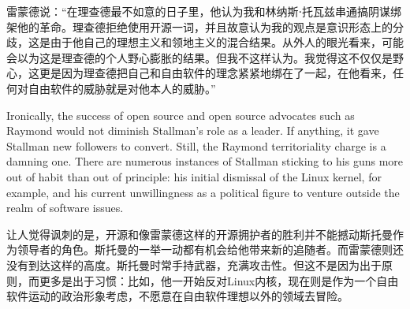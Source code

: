 \ifdefined\chs
雷蒙德说：``在理查德最不如意的日子里，他认为我和林纳斯⋅托瓦兹串通搞阴谋绑架他的革命。理查德拒绝使用开源一词，并且故意认为我的观点是意识形态上的分歧，这是由于他自己的理想主义和领地主义的混合结果。从外人的眼光看来，可能会以为这是理查德的个人野心膨胀的结果。但我不这样认为。我觉得这不仅仅是野心，这更是因为理查德把自己和自由软件的理念紧紧地绑在了一起，在他看来，任何对自由软件的威胁就是对他本人的威胁。''
\fi



\ifdefined\eng
Ironically, the success of open source and open source advocates such as Raymond would not diminish Stallman's role as a leader. If anything, it gave Stallman new followers to convert. Still, the Raymond territoriality charge is a damning one. There are numerous instances of Stallman sticking to his guns more out of habit than out of principle: his initial dismissal of the Linux kernel, for example, and his current unwillingness as a political figure to venture outside the realm of software issues.
\fi

\ifdefined\chs
让人觉得讽刺的是，开源和像雷蒙德这样的开源拥护者的胜利并不能撼动斯托曼作为领导者的角色。斯托曼的一举一动都有机会给他带来新的追随者。而雷蒙德则还没有到达这样的高度。斯托曼时常手持武器，充满攻击性。但这不是因为出于原则，而更多是出于习惯：比如，他一开始反对Linux内核，现在则是作为一个自由软件运动的政治形象考虑，不愿意在自由软件理想以外的领域去冒险。
\fi

